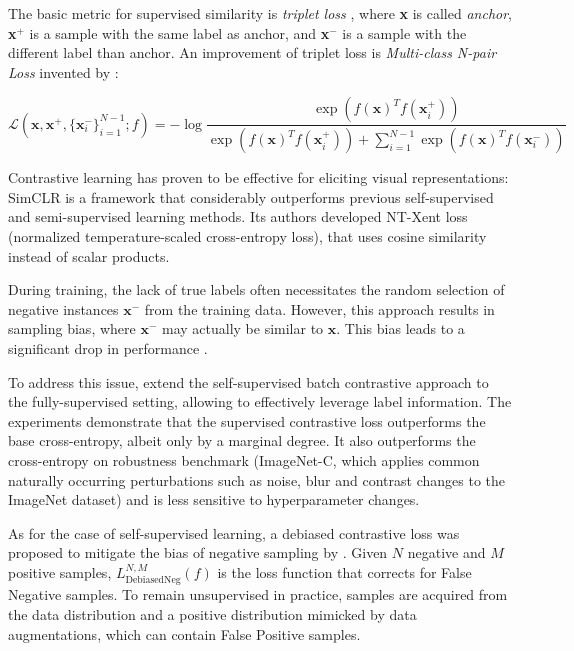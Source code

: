 \documentclass{article}
\begin{document}
The basic metric for supervised similarity is \textit{triplet loss} \citep{schroff2015facenet}, where \textbf{x} is called \textit{anchor}, \textbf{x}$^+$ is a sample with the same label as anchor, and \textbf{x}$^-$ is a sample with the different label than anchor. An improvement of triplet loss is \textit{Multi-class N-pair Loss} invented by \citep{NIPS2016_6b180037}:

\begin{equation} \label{eq:1}
\mathcal{L}(\textbf{x}, \textbf{x}^+, \{\textbf{x}_i^-\}_{i=1}^{N-1}; f) = - \log \frac{\exp(f(\textbf{x})^T f(\textbf{x}_i^+))}{\exp(f(\textbf{x})^T f(\textbf{x}_i^+)) + \sum _{i=1}^{N-1} \exp(f(\textbf{x})^Tf(\textbf{x}_i^-))}
\end{equation}

Contrastive learning has proven to be effective for eliciting visual representations: SimCLR \citep{Chen2020SimCLR} is a framework that considerably outperforms previous self-supervised and semi-supervised learning methods. Its authors developed NT-Xent loss (normalized temperature-scaled cross-entropy loss), that uses cosine similarity instead of scalar products.

During training, the lack of true labels often necessitates the random selection of negative instances $\textbf{x}^-$ from the training data. However, this approach results in sampling bias, where $\textbf{x}^-$ may actually be similar to $\textbf{x}$. This bias leads to a significant drop in performance \citep{hong2021unbiased}.

To address this issue, \citep{khosla2021supervised} extend the self-supervised batch contrastive approach to the fully-supervised setting, allowing to effectively leverage label information. The experiments demonstrate that the supervised contrastive loss outperforms the base cross-entropy, albeit only by a marginal degree. It also outperforms the cross-entropy on robustness benchmark (ImageNet-C, which applies common naturally occurring perturbations such as noise, blur and contrast changes to the ImageNet dataset) and is less sensitive to hyperparameter changes.

As for the case of self-supervised learning, a debiased contrastive loss was proposed to mitigate the bias of negative sampling by \citep{chuang2021debiased}. Given $N$ negative and $M$ positive samples, $L^{N, M}_{\text{DebiasedNeg}} (f)$ is the loss function that corrects for False Negative samples. To remain unsupervised in practice, samples are acquired from the data distribution and a positive distribution mimicked by data augmentations, which can contain False Positive samples.
\end{document}
